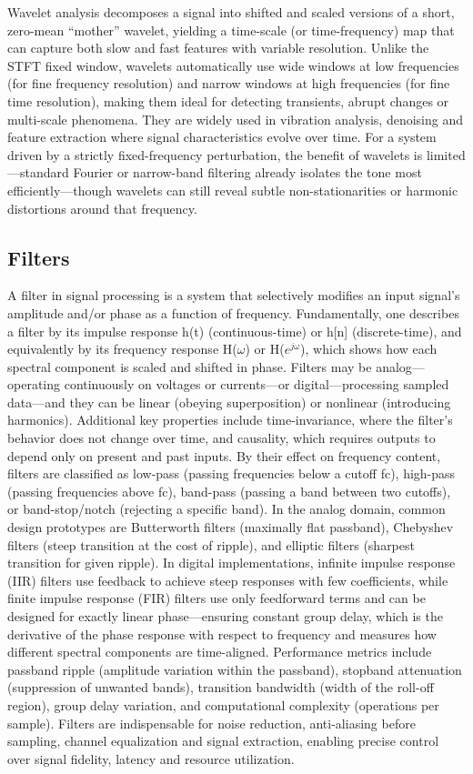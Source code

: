 Wavelet analysis decomposes a signal into shifted and scaled versions of a short, zero-mean “mother” wavelet, yielding a time-scale (or time-frequency) map that can capture both slow and fast features with variable resolution. Unlike the STFT fixed window, wavelets automatically use wide windows at low frequencies (for fine frequency resolution) and narrow windows at high frequencies (for fine time resolution), making them ideal for detecting transients, abrupt changes or multi-scale phenomena. They are widely used in vibration analysis, denoising and feature extraction where signal characteristics evolve over time. For a system driven by a strictly fixed-frequency perturbation, the benefit of wavelets is limited—standard Fourier or narrow-band filtering already isolates the tone most efficiently—though wavelets can still reveal subtle non-stationarities or harmonic distortions around that frequency.

\subsection{Filters}
A filter in signal processing is a system that selectively modifies an input signal's amplitude and/or phase as a function of frequency.  Fundamentally, one describes a filter by its impulse response h(t) (continuous-time) or h[n] (discrete-time), and equivalently by its frequency response H($\omega$) or H($e^{j\omega}$), which shows how each spectral component is scaled and shifted in phase.  Filters may be analog—operating continuously on voltages or currents—or digital—processing sampled data—and they can be linear (obeying superposition) or nonlinear (introducing harmonics).  Additional key properties include time-invariance, where the filter's behavior does not change over time, and causality, which requires outputs to depend only on present and past inputs.  By their effect on frequency content, filters are classified as low-pass (passing frequencies below a cutoff fc), high-pass (passing frequencies above fc), band-pass (passing a band between two cutoffs), or band-stop/notch (rejecting a specific band).  In the analog domain, common design prototypes are Butterworth filters (maximally flat passband), Chebyshev filters (steep transition at the cost of ripple), and elliptic filters (sharpest transition for given ripple).  In digital implementations, infinite impulse response (IIR) filters use feedback to achieve steep responses with few coefficients, while finite impulse response (FIR) filters use only feedforward terms and can be designed for exactly linear phase—ensuring constant group delay, which is the derivative of the phase response with respect to frequency and measures how different spectral components are time-aligned.  Performance metrics include passband ripple (amplitude variation within the passband), stopband attenuation (suppression of unwanted bands), transition bandwidth (width of the roll-off region), group delay variation, and computational complexity (operations per sample).  Filters are indispensable for noise reduction, anti-aliasing before sampling, channel equalization and signal extraction, enabling precise control over signal fidelity, latency and resource utilization.

